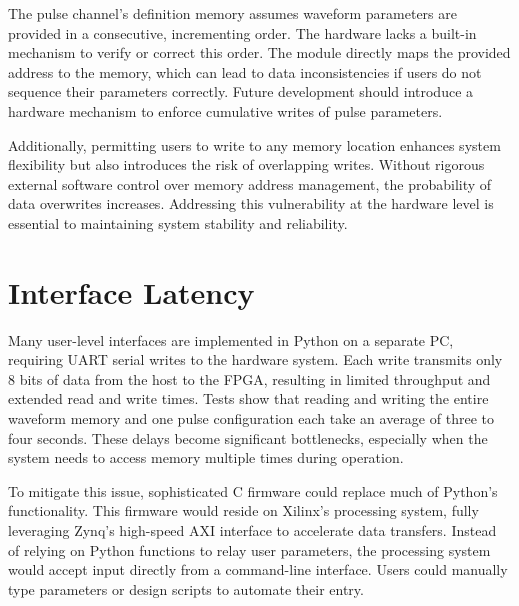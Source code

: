 The pulse channel's definition memory assumes waveform parameters are provided in a consecutive, incrementing order. The hardware lacks a built-in mechanism to verify or correct this order. The module directly maps the provided address to the memory, which can lead to data inconsistencies if users do not sequence their parameters correctly. Future development should introduce a hardware mechanism to enforce cumulative writes of pulse parameters.

Additionally, permitting users to write to any memory location enhances system flexibility but also introduces the risk of overlapping writes. Without rigorous external software control over memory address management, the probability of data overwrites increases. Addressing this vulnerability at the hardware level is essential to maintaining system stability and reliability.

\section{Interface Latency}
Many user-level interfaces are implemented in Python on a separate PC, requiring UART serial writes to the hardware system. Each write transmits only 8 bits of data from the host to the FPGA, resulting in limited throughput and extended read and write times. Tests show that reading and writing the entire waveform memory and one pulse configuration each take an average of three to four seconds. These delays become significant bottlenecks, especially when the system needs to access memory multiple times during operation.

To mitigate this issue, sophisticated C firmware could replace much of Python's functionality. This firmware would reside on Xilinx's processing system, fully leveraging Zynq's high-speed AXI interface to accelerate data transfers. Instead of relying on Python functions to relay user parameters, the processing system would accept input directly from a command-line interface. Users could manually type parameters or design scripts to automate their entry.